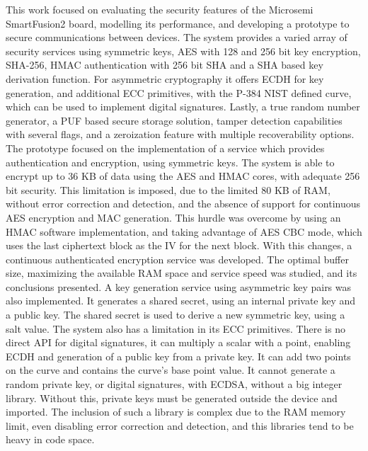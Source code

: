 \cleardoublepage
\label{chap:conclusion}

This work focused on evaluating the security features of the Microsemi SmartFusion2 board, modelling its performance, and developing a prototype to secure communications between devices.
The system provides a varied array of security services using symmetric keys, AES with 128 and 256 bit key encryption, SHA-256, HMAC authentication with 256 bit SHA and a SHA based key derivation function. For asymmetric cryptography it offers ECDH for key generation, and additional ECC primitives, with the P-384 NIST defined curve, which can be used to implement digital signatures. Lastly, a true random number generator, a PUF based secure storage solution, tamper detection capabilities with several flags, and a zeroization feature with multiple recoverability options.
The prototype focused on the implementation of a service which provides authentication and encryption, using symmetric keys. The system is able to encrypt up to 36 KB of data using the AES and HMAC cores, with adequate 256 bit security. This limitation is imposed, due to the limited 80 KB of RAM, without error correction and detection, and the absence of support for continuous AES encryption and MAC generation. This hurdle was overcome by using an HMAC software implementation, and taking advantage of AES CBC mode, which uses the last ciphertext block as the IV for the next block. With this changes, a continuous authenticated encryption service was developed. The optimal buffer size, maximizing the available RAM space and service speed was studied, and its conclusions presented.
A key generation service using asymmetric key pairs was also implemented. It generates a shared secret, using an internal private key and a public key. The shared secret is used to derive a new symmetric key, using a salt value.
The system also has a limitation in its ECC primitives. There is no direct API for digital signatures, it can multiply a scalar with a point, enabling ECDH and generation of a public key from a private key. It can add two points on the curve and contains the curve's base point value. It cannot generate a random private key, or digital signatures, with ECDSA, without a big integer library. Without this, private keys must be generated outside the device and imported. The inclusion of such a library is complex due to the RAM memory limit, even disabling error correction and detection, and this libraries tend to be heavy in code space. 
